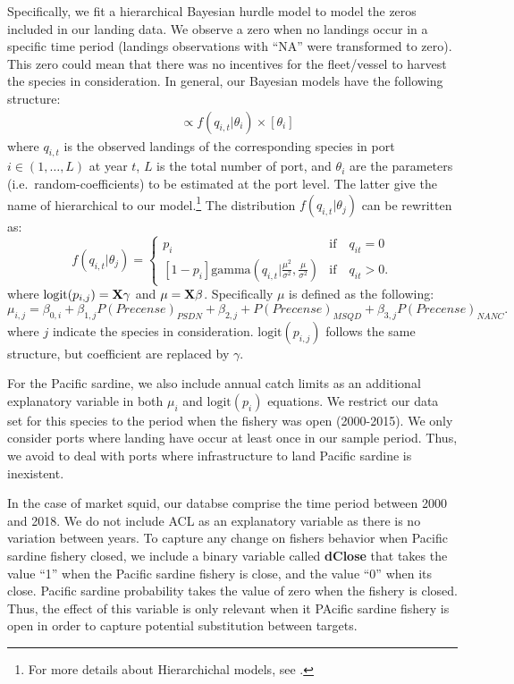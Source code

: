 Specifically, we fit a hierarchical Bayesian hurdle model to model the
zeros included in our landing data. We observe a zero when no landings
occur in a specific time period (landings observations with ``NA'' were
transformed to zero). This zero could mean that there was no incentives
for the fleet/vessel to harvest the species in consideration. In
general, our Bayesian models have the following structure:
\begin{align*}
[\theta_i | q_{i,t}] &  \varpropto f\left(q_{i,t} | \theta_i\right) \times [\theta_i] 
\end{align*} where \(q_{i,t}\) is the observed landings of the
corresponding species in port \(i \in (1,\ldots,L)\) at year \(t\),
\(L\) is the total number of port, and \(\theta_i\) are the parameters
(i.e.~random-coefficients) to be estimated at the port level. The latter
give the name of hierarchical to our model.\footnote{For more details
  about Hierarchichal models, see \cite{hobbs2015}.} The distribution
\(f\left(q_{i,t} | \theta_j\right)\) can be rewritten as:
\begin{equation}
f\left(q_{i,t} | \theta_j \right) = \begin{cases}
p_i & \text{if} \quad q_{it} = 0  \\ 
\left[1-p_i\right] \text{gamma} \left(q_{i,t} | \frac{\mu^2}{\sigma^2}, \frac{\mu}{\sigma^2} \right) & \text{if} \quad q_{it} > 0. 
\end{cases}
\end{equation} where \(\text{logit}(p_{i,j}) = \bf{X}\gamma\) and
\(\mu = \bf{X}\beta\). Specifically \(\mu\) is defined as the following:
\begin{equation}
\mu_{i,j} = \beta_{0,i} + \beta_{1,j} P(Precense)_{PSDN} + \beta_{2,j} + P(Precense)_{MSQD} + \beta_{3,j} P(Precense)_{NANC}.
\end{equation} where \(j\) indicate the species in consideration.
\(\text{logit}(p_{i,j})\) follows the same structure, but coefficient
are replaced by \(\gamma\).

For the Pacific sardine, we also include annual catch limits as an
additional explanatory variable in both \(\mu_i\) and
\(\text{logit}(p_i)\) equations. We restrict our data set for this
species to the period when the fishery was open (2000-2015). We only
consider ports where landing have occur at least once in our sample
period. Thus, we avoid to deal with ports where infrastructure to land
Pacific sardine is inexistent.

In the case of market squid, our databse comprise the time period
between 2000 and 2018. We do not include ACL as an explanatory variable
as there is no variation between years. To capture any change on fishers
behavior when Pacific sardine fishery closed, we include a binary
variable called \textbf{dClose} that takes the value ``1'' when the
Pacific sardine fishery is close, and the value ``0'' when its close.
Pacific sardine probability takes the value of zero when the fishery is
closed. Thus, the effect of this variable is only relevant when it
PAcific sardine fishery is open in order to capture potential
substitution between targets.

